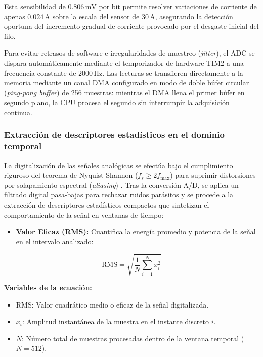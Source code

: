 Esta sensibilidad de $0.806\,\text{mV}$ por bit permite resolver variaciones de corriente de apenas $0.024\,\text{A}$ sobre la escala del sensor de $30\,\text{A}$, asegurando la detección oportuna del incremento gradual de corriente provocado por el desgaste inicial del filo.

Para evitar retrasos de software e irregularidades de muestreo (\textit{jitter}), el ADC se dispara automáticamente mediante el temporizador de hardware TIM2 a una frecuencia constante de $2000\,\text{Hz}$. Las lecturas se transfieren directamente a la memoria mediante un canal DMA configurado en modo de doble búfer circular (\textit{ping-pong buffer}) de 256 muestras: mientras el DMA llena el primer búfer en segundo plano, la CPU procesa el segundo sin interrumpir la adquisición continua.


\subsubsection{Extracción de descriptores estadísticos en el dominio temporal}

La digitalización de las señales analógicas se efectúa bajo el cumplimiento riguroso del teorema de Nyquist-Shannon ($f_s \ge 2 f_{\max}$) para suprimir distorsiones por solapamiento espectral (\textit{aliasing}) \citep{sevilla2011}. Tras la conversión A/D, se aplica un filtrado digital pasa-bajas para rechazar ruidos parásitos y se procede a la extracción de descriptores estadísticos compactos que sintetizan el comportamiento de la señal en ventanas de tiempo:

\begin{itemize}
    \item \textbf{Valor Eficaz (RMS):} Cuantifica la energía promedio y potencia de la señal en el intervalo analizado:
\end{itemize}

\begin{equation}
\text{RMS} = \sqrt{\frac{1}{N} \sum_{i=1}^{N} x_i^2}
\label{eq:rms}
\end{equation}

\noindent\textbf{Variables de la ecuación:}
\begin{itemize}
    \item $\text{RMS}$: Valor cuadrático medio o eficaz de la señal digitalizada.
    \item $x_i$: Amplitud instantánea de la muestra en el instante discreto $i$.
    \item $N$: Número total de muestras procesadas dentro de la ventana temporal ($N=512$).
\end{itemize}

